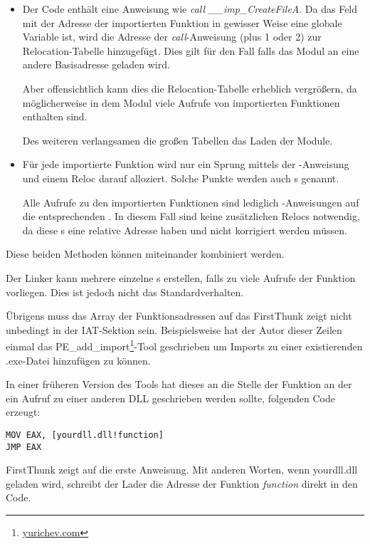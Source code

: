 \begin{itemize}
\item Der Code enthält eine Anweisung wie \emph{call \_\_imp\_CreateFileA}. Da das Feld
mit der Adresse der importierten Funktion in gewisser Weise eine globale Variable
ist, wird die Adresse der \emph{call}-Anweisung (plus 1 oder 2) zur Relocation-Tabelle
hinzugefügt. Dies gilt für den Fall falls das Modul an eine andere Basisadresse
geladen wird.

Aber offensichtlich kann dies die Relocation-Tabelle erheblich vergrößern, da
möglicherweise in dem Modul viele Aufrufe von importierten Funktionen enthalten sind.

Des weiteren verlangsamen die großen Tabellen das Laden der Module.

\item Für jede importierte Funktion wird nur ein Sprung mittels der \JMP-Anweisung
und einem Reloc darauf alloziert.
Solche Punkte werden auch s genannt.

Alle Aufrufe zu den importierten Funktionen sind lediglich \CALL-Anweisungen auf
die entsprechenden .
In diesem Fall sind keine zusätzlichen Relocs notwendig, da diese \CALL{}s eine
relative Adresse haben und nicht korrigiert werden müssen.
\end{itemize}

Diese beiden Methoden können miteinander kombiniert werden.

Der Linker kann mehrere einzelne s erstellen, falls zu viele Aufrufe der
Funktion vorliegen. Dies ist jedoch nicht das Standardverhalten.

Übrigens muss das Array der Funktionsadressen auf das FirstThunk zeigt nicht unbedingt
in der \ac{IAT}-Sektion sein. Beispielsweise hat der Autor dieser Zeilen einmal das
PE\_add\_import\footnote{\href{http://yurichev.com/PE_add_imports.html}{yurichev.com}}-Tool
geschrieben um Imports zu einer existierenden .exe-Datei hinzufügen zu können.

In einer früheren Version des Tools hat dieses an die Stelle der Funktion an der
ein Aufruf zu einer anderen DLL geschrieben werden sollte, folgenden Code erzeugt:

\begin{lstlisting}
MOV EAX, [yourdll.dll!function]
JMP EAX
\end{lstlisting}

FirstThunk zeigt auf die erste Anweisung. Mit anderen Worten, wenn yourdll.dll
geladen wird, schreibt der Lader die Adresse der Funktion \emph{function} direkt
in den Code.

